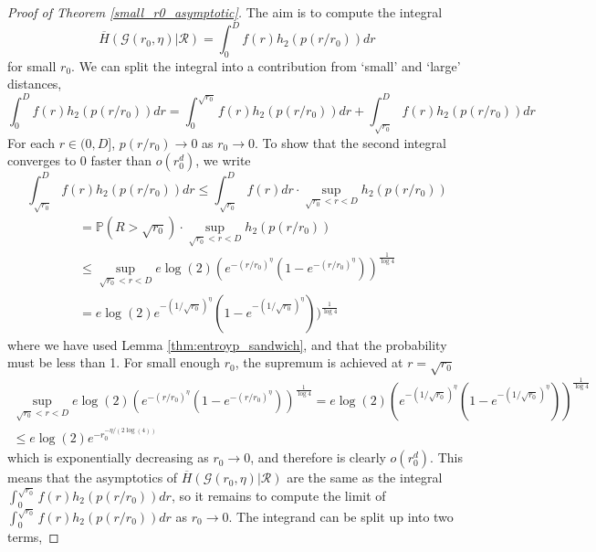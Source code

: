 \documentclass{article}
\newcommand{\graph}{\mathcal{G}}
\newcommand{\prob}[1]{\mathbb{P}\left(#1\right)}
\newcommand{\ttz}[0]{\rightarrow 0}
\begin{document}
    \begin{proof}[Proof of Theorem \ref{small_r0_asymptotic}]
    
        The aim is to compute the integral
        \begin{equation}
            \overline{H}(\graph(r_0,\eta)|\mathcal{R}) = \int_0^D f(r)h_2(p(r/r_0))dr
        \end{equation}
        for small $r_0$.
        We can split the integral into a contribution from `small' and `large' distances,
        \begin{equation}
            \int_0^D f(r)h_2(p(r/r_0))dr = \int_0^{\sqrt{r_0}} f(r)h_2(p(r/r_0))dr + \int_{\sqrt{r_0}}^D f(r)h_2(p(r/r_0))dr
        \end{equation}
        For each $r \in (0,D]$, $p(r/r_0) \ttz$ as $r_0 \ttz$. To show that the second integral converges to 0 faster than $o(r_0^d)$, we write
        \begin{equation}
            \int_{\sqrt{r_0}}^D f(r)h_2(p(r/r_0))dr \leq \int_{\sqrt{r_0}}^Df(r)dr \cdot \sup_{\sqrt{r_0} < r < D} h_2(p(r/r_0))    
        \end{equation}
        \begin{gather}
            = \prob{R > \sqrt{r_0}} \cdot \sup_{\sqrt{r_0} < r < D} h_2(p(r/r_0)) \nonumber \\
            \leq \sup_{\sqrt{r_0} < r < D} e\log(2)(e^{-(r/r_0)^{\eta}}(1-e^{-(r/r_0)^{\eta}}))^{\frac{1}{\log 4}} \nonumber \\
             = e \log(2) e^{-(1/\sqrt{r_0})^{\eta}}(1-e^{-(1/\sqrt{r_0})^{\eta}}))^{\frac{1}{\log 4}} 
        \end{gather}
        where we have used Lemma \ref{thm:entroyp_sandwich}, and that the probability must be less than 1. For small enough $r_0$, the supremum is achieved at $r=\sqrt{r_0}$
        \begin{gather}
              \sup_{\sqrt{r_0} < r < D} e\log(2)(e^{-(r/r_0)^{\eta}}(1-e^{-(r/r_0)^{\eta}}))^{\frac{1}{\log 4}} = e \log(2) (e^{-(1/\sqrt{r_0})^{\eta}}(1-e^{-(1/\sqrt{r_0})^{\eta}}))^{\frac{1}{\log 4}} \nonumber \\
              \leq e\log (2) e^{-r_0^{-\eta/(2\log(4))}}
        \end{gather}
        which is exponentially decreasing as $r_0 \ttz$, and therefore is clearly $o(r_0^d)$. This means that the asymptotics of $\overline{H}(\graph(r_0,\eta)|\mathcal{R})$ are the same as the integral $\int_0^{\sqrt{r_0}}f(r)h_2(p(r/r_0))dr$,  so it remains to compute the limit of $\int_0^{\sqrt{r_0}} f(r)h_2(p(r/r_0))dr$ as $r_0 \ttz$. The integrand can be split up into two terms,

\end{proof}
\end{document}
